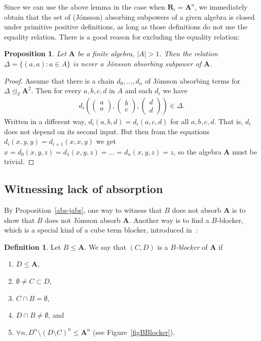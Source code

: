 \documentclass{amsart}
\theoremstyle{plain}
\newtheorem{proposition}[theorem]{Proposition}
\theoremstyle{definition}
\newtheorem{definition}[theorem]{Definition}
\begin{document}
Since we can use the above lemma in the case when
${\mathbf{{R}}}_i={{\mathbf{A}}}^n$, we immediately obtain that the set of (J\'onsson) absorbing subpowers
of a given algebra is closed under primitive positive definitions, as long as
those definitions do not use the equality relation. There is a good reason for excluding the equality relation:
\begin{proposition}
  Let ${{\mathbf{A}}}$ be a finite algebra, $|A|>1$. Then the relation $\Delta=\{(a,a) \colon a\in A\}$
  is never a J\'onsson absorbing subpower of ${{\mathbf{A}}}$.
\end{proposition}
\begin{proof}
  Assume that there is a chain $d_0,\dots,d_n$ of J\'onsson absorbing terms for
  $\Delta\operatorname{\trianglelefteq_J} {{\mathbf{A}}}^2$. 
  Then for every $a,b,c,d$ in $A$ and each $d_i$ we have
  \begin{align*}
  d_i\left(\begin{pmatrix}a\\a\end{pmatrix},\begin{pmatrix}b\\c\end{pmatrix},\begin{pmatrix}d\\d\end{pmatrix}\right)\in\Delta.
  \end{align*}
  Written in a different way, $d_i(a,b,d)=d_i(a,c,d)$ for all $a,b,c,d$. That
  is,
  $d_i$ does not depend on its second input. But then from the equations
  $d_i(x,y,y)=d_{i+1}(x,x,y)$ we get
  $x=d_0(x,y,z)=d_1(x,y,z)=\dots=d_n(x,y,z)=z$, so the algebra
  ${{\mathbf{A}}}$ must be trivial.
\end{proof}

\subsection{Witnessing lack of absorption}\label{secBlockers}
By Proposition~\ref{abs-jabs},
one way to witness that $B$ does not absorb ${{\mathbf{A}}}$ is to show that $B$ does not J\'onsson absorb ${{\mathbf{A}}}$.
Another way is to find a $B$-blocker, which is a special
kind of a cube term blocker, introduced
in~\cite{markovic-maroti-mckenzie-blockers}:
\begin{definition} \label{def-blocker}
  Let $B\leq {{\mathbf{A}}}$. We say that $(C,D)$  is a \emph{$B$-blocker} of ${{\mathbf{A}}}$ if
\begin{enumerate}
  \item $D \leq {{\mathbf{A}}}$,
  \item $\emptyset\neq C\subset D$,
  \item $C\cap B=\emptyset$,
  \item $D\cap B\neq\emptyset$, and
  \item \label{itmCondBBlocker} $\forall n,  D^n\setminus (D\setminus C)^n \leq {{\mathbf{A}}}^n$ (see
  Figure~\ref{figBBlocker}).
\end{enumerate}
\end{definition}
\end{document}

